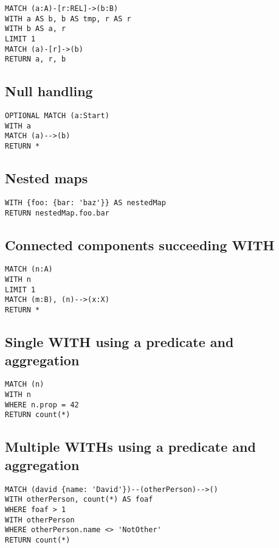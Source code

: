 \begin{lstlisting}
MATCH (a:A)-[r:REL]->(b:B)
WITH a AS b, b AS tmp, r AS r
WITH b AS a, r
LIMIT 1
MATCH (a)-[r]->(b)
RETURN a, r, b
\end{lstlisting}

\subsection{Null handling}

\begin{lstlisting}
OPTIONAL MATCH (a:Start)
WITH a
MATCH (a)-->(b)
RETURN *
\end{lstlisting}

\subsection{Nested maps}

\begin{lstlisting}
WITH {foo: {bar: 'baz'}} AS nestedMap
RETURN nestedMap.foo.bar
\end{lstlisting}

\subsection{Connected components succeeding WITH}

\begin{lstlisting}
MATCH (n:A)
WITH n
LIMIT 1
MATCH (m:B), (n)-->(x:X)
RETURN *
\end{lstlisting}

\subsection{Single WITH using a predicate and aggregation}

\begin{lstlisting}
MATCH (n)
WITH n
WHERE n.prop = 42
RETURN count(*)
\end{lstlisting}

\subsection{Multiple WITHs using a predicate and aggregation}

\begin{lstlisting}
MATCH (david {name: 'David'})--(otherPerson)-->()
WITH otherPerson, count(*) AS foaf
WHERE foaf > 1
WITH otherPerson
WHERE otherPerson.name <> 'NotOther'
RETURN count(*)
\end{lstlisting}
